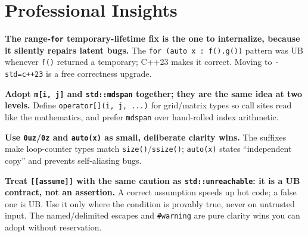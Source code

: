 \section{Professional Insights}

\textbf{The range-\lstinline|for| temporary-lifetime fix is the one to internalize, because it silently repairs latent bugs.} The \lstinline|for (auto x : f().g())| pattern was UB whenever \lstinline|f()| returned a temporary; C++23 makes it correct. Moving to \lstinline|-std=c++23| is a free correctness upgrade.

\textbf{Adopt \lstinline|m[i, j]| and \lstinline|std::mdspan| together; they are the same idea at two levels.} Define \lstinline|operator[](i, j, ...)| for grid/matrix types so call sites read like the mathematics, and prefer \lstinline|mdspan| over hand-rolled index arithmetic.

\textbf{Use \lstinline|0uz|/\lstinline|0z| and \lstinline|auto(x)| as small, deliberate clarity wins.} The suffixes make loop-counter types match \lstinline|size()|/\lstinline|ssize()|; \lstinline|auto(x)| states ``independent copy'' and prevents self-aliasing bugs.

\textbf{Treat \lstinline|[[assume]]| with the same caution as \lstinline|std::unreachable|: it is a UB contract, not an assertion.} A correct assumption speeds up hot code; a false one is UB. Use it only where the condition is provably true, never on untrusted input. The named/delimited escapes and \lstinline|#warning| are pure clarity wins you can adopt without reservation.
